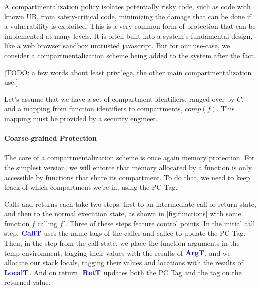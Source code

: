\documentclass{llncs}
\begin{document}
A compartmentalization policy isolates potentially risky code, such as code with known UB,
from safety-critical code, minimizing the damage that can be done if a vulnerability is exploited.
This is a very common form of protection that can be implemented at many levels. It is often built
into a system's fundamental design, like a web browser sandbox untrusted javascript.
But for our use-case, we consider a compartmentalization scheme being added to the system
after the fact.

[TODO: a few words about least privilege, the other main compartmentalization use.]

Let's assume that we have a set of compartment identifiers, ranged over by \(C\), and a mapping
from function identifiers to compartments, \(\mathit{comp}(f)\). This mapping must be provided by
a security engineer.

\paragraph{Coarse-grained Protection}

%
The core of a compartmentalization scheme is once again memory protection. For the simplest version,
we will enforce that memory allocated by a function is only accessible by functions that share its
compartment. To do that, we need to keep track of which compartment we're in, using the PC Tag.

Calls and returns each take two steps: first to an intermediate call or return state, and
then to the normal execution state, as shown in \cref{fig:functions} with some function \(f\)
calling \(f'\). Three of these steps feature control points. In the initial call step, \(\color{blue} \mathbf{CallT}\)
uses the name-tags of the caller and callee to update the PC Tag. Then, in the step from the call
state, we place the function arguments in the temp environment, tagging their values with
the results of \(\color{blue} \mathbf{ArgT}\), and we allocate our stack locals, tagging their values and locations
with the results of \(\color{blue} \mathbf{LocalT}\). And on return, \(\color{blue} \mathbf{RetT}\) updates both the PC Tag and
the tag on the returned value.
\end{document}
